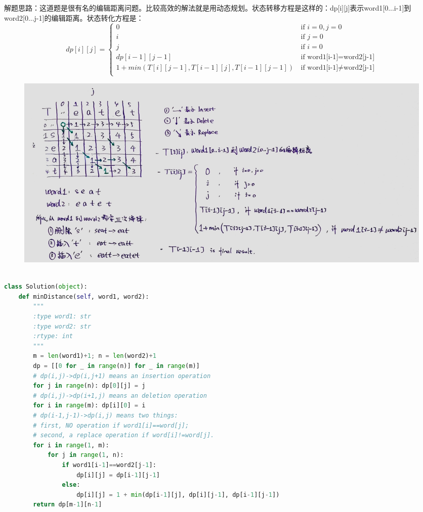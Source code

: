 \documentclass[a4paper,10pt]{article}
\begin{document}
\begin{CJK*}{UTF8}{gbsn}
\noindent 解题思路：这道题是很有名的编辑距离问题。比较高效的解法就是用动态规划。状态转移方程是这样的：dp[i][j]表示word1[0...i-1]到word2[0...j-1]的编辑距离。状态转化方程是：
\[ dp[i][j] =
  \begin{cases}
    0  & \, \text{if } i=0, j=0\\
    i  & \, \text{if } j=0\\
    j  & \, \text{if } i=0\\
    dp[i-1][j-1]   & \, \text{if word1[i-1]=word2[j-1]}\\
    1+min(T[i][j-1], T[i-1][j], T[i-1][j-1])    & \, \text{if word1[i-1]} \neq \text{word2[j-1]}\\
  \end{cases}
\]
\end{CJK*}

\begin{figure}[h]
\includegraphics[width=\textwidth]{leetcode72.jpg}
\centering \\
\end{figure}

\begin{lstlisting}[language=Python, caption=Problem72. Edit Distance]

class Solution(object):
    def minDistance(self, word1, word2):
        """
        :type word1: str
        :type word2: str
        :rtype: int
        """
        m = len(word1)+1; n = len(word2)+1
        dp = [[0 for _ in range(n)] for _ in range(m)]
        # dp(i,j)->dp(i,j+1) means an insertion operation
        for j in range(n): dp[0][j] = j
        # dp(i,j)->dp(i+1,j) means an deletion operation 
        for i in range(m): dp[i][0] = i
        # dp(i-1,j-1)->dp(i,j) means two things:
        # first, NO operation if word1[i]==word[j];
        # second, a replace operation if word[i]!=word[j].
        for i in range(1, m):
            for j in range(1, n):
                if word1[i-1]==word2[j-1]:
                    dp[i][j] = dp[i-1][j-1]
                else:
                    dp[i][j] = 1 + min(dp[i-1][j], dp[i][j-1], dp[i-1][j-1])
        return dp[m-1][n-1]
\end{lstlisting}
\end{document}
